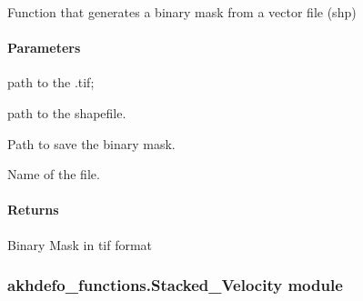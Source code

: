 \documentclass[letterpaper,10pt,english]{sphinxmanual}
\begin{document}

\begin{fulllineitems}
\label{\detokenize{akhdefo_functions:akhdefo_functions.OpticalFlow.binary_mask}}
\pysigstartsignatures
{}
\pysigstopsignatures
\sphinxAtStartPar
Function that generates a binary mask from a vector file (shp)


\paragraph{Parameters}
\label{\detokenize{akhdefo_functions:id35}}\begin{description}
\sphinxAtStartPar
path to the .tif;

\sphinxAtStartPar
path to the shapefile.

\sphinxAtStartPar
Path to save the binary mask.

\sphinxAtStartPar
Name of the file.

\end{description}


\paragraph{Returns}
\label{\detokenize{akhdefo_functions:id36}}\begin{description}
\sphinxAtStartPar
Binary Mask in tif format

\end{description}

\end{fulllineitems}



\subsubsection{akhdefo\_functions.Stacked\_Velocity module}
\label{\detokenize{akhdefo_functions:module-akhdefo_functions.Stacked_Velocity}}\label{\detokenize{akhdefo_functions:akhdefo-functions-stacked-velocity-module}}
\end{document}
